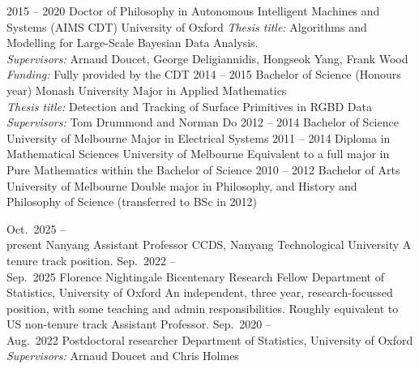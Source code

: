 \documentclass[9pt]{developercv} %
\begin{document}
\begin{entrylist}
  \entry
    {2015 -- 2020}
    {Doctor of Philosophy in Autonomous Intelligent Machines and Systems (AIMS CDT)}
    {University of Oxford}
    {\textit{Thesis title:} Algorithms and Modelling for Large-Scale Bayesian Data Analysis. \\
    \textit{Supervisors:} Arnaud Doucet, George Deligiannidis, Hongseok Yang, Frank Wood \\
    \textit{Funding:} Fully provided by the CDT
    }
  \entry
    {2014 -- 2015}
    {Bachelor of Science (Honours year)}
    {Monash University}
    {Major in Applied Mathematics \\
    \textit{Thesis title:} Detection and Tracking of Surface Primitives in RGBD Data\\
    \textit{Supervisors:} Tom Drummond and Norman Do}
  \entry
    {2012 -- 2014}
    {Bachelor of Science}
    {University of Melbourne}
    {Major in Electrical Systems}
  \entry
    {2011 -- 2014}
    {Diploma in Mathematical Sciences }
    {University of Melbourne}
    {Equivalent to a full major in Pure Mathematics within the Bachelor of Science}
  \entry
    {2010 -- 2012}
    {Bachelor of Arts}
    {University of Melbourne}
    {Double major in Philosophy, and History and Philosophy of Science (transferred to BSc in 2012)}
\end{entrylist}

\begin{entrylist}
    \entry
    {Oct.\ 2025 --\\ present}
    {Nanyang Assistant Professor}
    {CCDS, Nanyang Technological University}
    {A tenure track position.}
    \entry
    {Sep.\ 2022 --\\ Sep.\ 2025}
    {Florence Nightingale Bicentenary Research Fellow}
    {Department of Statistics, University of Oxford}
    {An independent, three year, research-focussed position, with some teaching and admin responsibilities. Roughly equivalent to US non-tenure track Assistant Professor.}
    \entry
    {Sep.\ 2020 --\\ Aug.\ 2022}
    {Postdoctoral researcher}
    {Department of Statistics, University of Oxford}
    {
    \textit{Supervisors:} Arnaud Doucet and Chris Holmes}

\end{entrylist}

\end{document}
